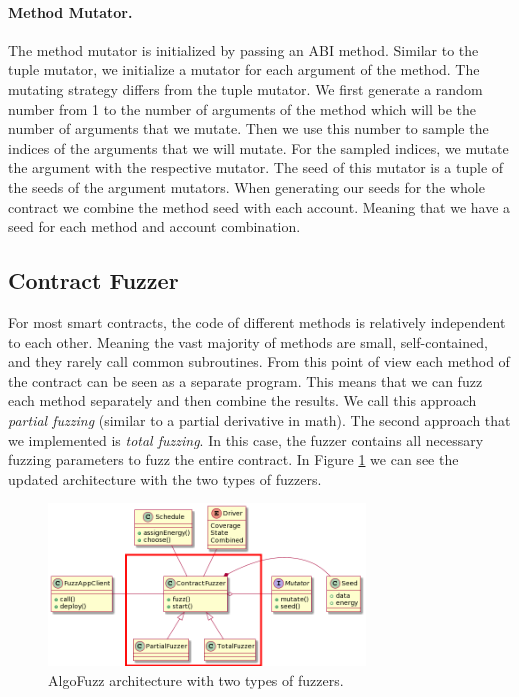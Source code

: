 \paragraph{Method Mutator.}
The method mutator is initialized by passing an \ac{ABI} method.
Similar to the tuple mutator, we initialize a mutator for each argument of the method.
The mutating strategy differs from the tuple mutator.
We first generate a random number from 1 to the number of arguments of the method which will be the number of arguments that we mutate.
Then we use this number to sample the indices of the arguments that we will mutate.
For the sampled indices, we mutate the argument with the respective mutator.
The seed of this mutator is a tuple of the seeds of the argument mutators.
When generating our seeds for the whole contract we combine the method seed with each account. Meaning that we have a seed for each method and account combination.


\subsection*{Contract Fuzzer}
For most smart contracts, the code of different methods is relatively independent to each other.
Meaning the vast majority of methods are small, self-contained, and they rarely call common subroutines.
From this point of view each method of the contract can be seen as a separate program.
This means that we can fuzz each method separately and then combine the results.
We call this approach \textit{partial fuzzing} (similar to a partial derivative in math). The second approach that we implemented is \textit{total fuzzing}.
In this case, the fuzzer contains all necessary fuzzing parameters to fuzz the entire contract.
In Figure \ref{fig:architecture-fuzzers} we can see the updated architecture with the two types of fuzzers.

\begin{figure}[htbp]
    \centering
    \includegraphics[width=0.75\textwidth]{figures/arc-fuzzers-r.png}
    \caption{AlgoFuzz architecture with two types of fuzzers.}\label{fig:architecture-fuzzers}
\end{figure}

